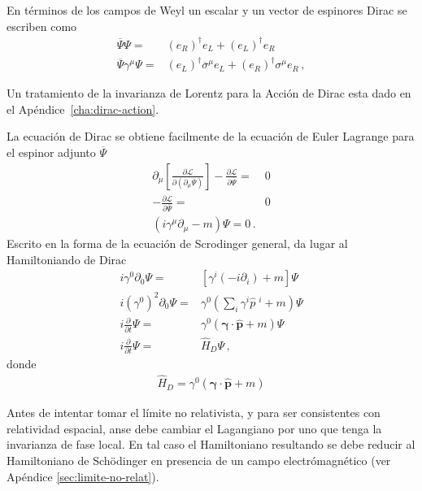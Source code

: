 En términos de los campos de Weyl un escalar y un vector de espinores Dirac se escriben como
\begin{align}
\label{eq:mwd}
  \overline{\Psi}\Psi =& \left( e_R \right)^\dagger e_L+\left( e_L \right)^{\dagger}e_R \nonumber\\
  \overline{\Psi}\gamma^{\mu}\Psi=& (e_L)^{\dagger}\overline{\sigma}^{\mu}e_L+(e_R)^{\dagger}\sigma^{\mu}e_{R}\,,
\end{align}


Un tratamiento de la invarianza de Lorentz para la Acción de Dirac esta dado en el Apéndice~\ref{cha:dirac-action}. 

\begin{frame}
La ecuación de Dirac se obtiene facilmente de la ecuación de Euler Lagrange para el espinor adjunto $\overline{\Psi}$
\begin{align}
  \partial_{\mu}\left[ \frac{\partial\mathcal{L}}{\partial \left( \partial_{\mu} \overline{\Psi} \right)} \right]-\frac{\partial \mathcal{L}}{\partial \overline{\Psi}}=&0 \nonumber\\
-\frac{\partial \mathcal{L}}{\partial \overline{\Psi}}=&0 \nonumber\\
\left( i\gamma^{\mu}\partial_{\mu}-m \right)\Psi=0\,.
\end{align}
Escrito en la forma de la ecuación de Scrodinger general, da lugar al Hamiltoniando de Dirac
\begin{align}
  i\gamma^0 \partial_{0}\Psi=&\left[ \gamma^{i} \left( -i \partial_{i}\right)+m \right]\Psi \nonumber\\
  i \left( \gamma^0 \right)^2 \partial_{0}\Psi=&\gamma^0\left( \sum_i\gamma^{i} \widehat{p}\;^i +m \right)\Psi \nonumber\\
  i \frac{\partial}{\partial t}\Psi=&\gamma^0\left( \boldsymbol{\gamma}\cdot \widehat{\mathbf{p}} +m \right)\Psi \nonumber\\
  i \frac{\partial}{\partial t}\Psi=&\widehat{H}_D\Psi\,,
\end{align}
donde
\begin{align}
  \widehat{H}_D=\gamma^0\left( \boldsymbol{\gamma}\cdot \widehat{\mathbf{p}} +m \right)
\end{align}
\end{frame}
Antes de intentar tomar el límite no relativista, y para ser consistentes con relatividad espacial, anse debe cambiar el Lagangiano por uno que tenga la invarianza de fase local. En tal caso el Hamiltoniano resultando se debe reducir al Hamiltoniano de  Sch\"odinger en presencia de un campo electrómagnético (ver Apéndice \ref{sec:limite-no-relat}).


